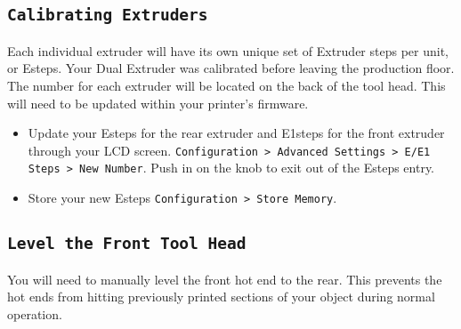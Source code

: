 \subsection{\texttt{Calibrating Extruders}}
Each individual extruder will have its own unique set of Extruder steps per unit, or Esteps. Your Dual Extruder was calibrated before leaving the production floor. The number for each extruder will be located on the back of the tool head. This will need to be updated within your printer's firmware.
\begin{itemize}
\item Update your Esteps for the rear extruder and E1steps for the front extruder through your LCD screen. \texttt{Configuration > Advanced Settings > E/E1 Steps > New Number}. Push in on the knob to exit out of the Esteps entry.
\item Store your new Esteps \texttt{Configuration > Store Memory}.
\end{itemize}

\subsection{\texttt{Level the Front Tool Head}}
You will need to manually level the front hot end to the rear. This prevents the hot ends from hitting previously printed sections of your object during normal operation. 

